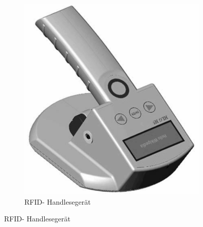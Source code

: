 \begin{figure} [h]
\qquad
%
         \begin{subfigure}[h]{0.4\textwidth}
                 \centering
                 \includegraphics[width=\textwidth]{img/RFID-Reader_gs.png}
                 \vspace{.1cm}
                 \caption{ RFID- Handlesegerät }
                 \label{fig:READER}
         \end{subfigure}
\end{figure}
%
\label{sec:Measurement1}
%
